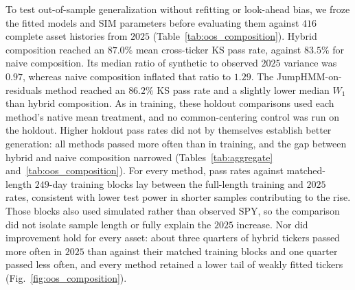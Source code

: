 To test out-of-sample generalization without refitting or look-ahead
bias, we froze the fitted models and SIM parameters before evaluating
them against $416$ complete asset histories from $2025$
(Table~\ref{tab:oos_composition}). Hybrid composition reached an
$87.0\%$ mean cross-ticker KS pass rate, against $83.5\%$ for naive
composition. Its median ratio of synthetic to observed $2025$ variance
was $0.97$, whereas naive composition inflated that ratio to $1.29$.
The JumpHMM-on-residuals method reached an $86.2\%$ KS pass rate and a slightly lower median $W_1$ than hybrid composition. As in
training, these holdout comparisons used each method's native mean
treatment, and no common-centering control was run on the holdout. Higher holdout pass rates did not by themselves establish better
generation: all methods passed more often than in training, and the
gap between hybrid and naive composition narrowed (Tables~\ref{tab:aggregate}
and~\ref{tab:oos_composition}). For every method, pass rates against
matched-length $249$-day training blocks lay between the full-length
training and $2025$ rates, consistent with lower test power in shorter
samples contributing to the rise. Those blocks also used simulated
rather than observed SPY, so the comparison did not isolate sample
length or fully explain the $2025$ increase. Nor did improvement hold
for every asset: about three quarters of hybrid tickers passed more
often in $2025$ than against their matched training blocks and one
quarter passed less often, and every method retained a lower tail of
weakly fitted tickers (Fig.~\ref{fig:oos_composition}).

